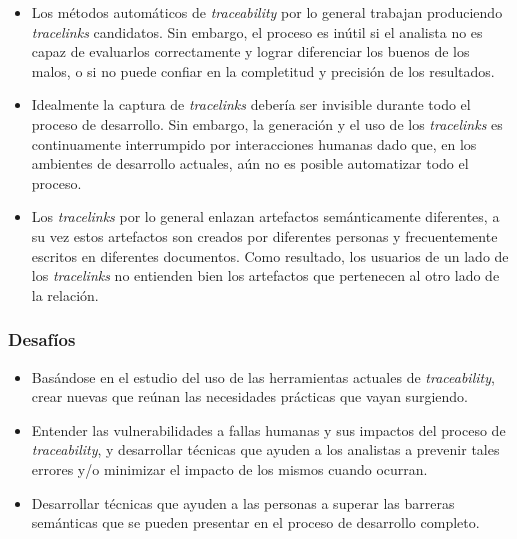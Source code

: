 \documentclass[a4paper,12pt,oneside,spanish]{book}
\begin{document}
\begin{itemize}[label={$\times$}]

\item Los métodos automáticos de \textit{traceability} por lo general trabajan produciendo \textit{tracelinks} candidatos. Sin embargo, el proceso es inútil si el analista no es capaz de evaluarlos correctamente y lograr diferenciar los buenos de los malos, o si no puede confiar en la completitud y precisión de los resultados.

\item Idealmente la captura de \textit{tracelinks} debería ser invisible durante todo el proceso de desarrollo. Sin embargo, la generación y el uso de los \textit{tracelinks} es continuamente interrumpido por interacciones humanas dado que, en los ambientes de desarrollo actuales, aún no es posible automatizar todo el proceso.

\item Los \textit{tracelinks} por lo general enlazan artefactos semánticamente diferentes, a su vez estos artefactos son creados por diferentes personas y frecuentemente escritos en diferentes documentos. Como resultado, los usuarios de un lado de los \textit{tracelinks} no entienden bien los artefactos que pertenecen al otro lado de la relación.

\end{itemize}

\subsubsection{Desafíos}

\begin{itemize}[label={\checkmark}]

\item Basándose en el estudio del uso de las herramientas actuales de \textit{traceability}, crear nuevas que reúnan las necesidades prácticas que vayan surgiendo.

\item Entender las vulnerabilidades a fallas humanas y sus impactos del proceso de \textit{traceability}, y desarrollar técnicas que ayuden a los analistas a prevenir tales errores y/o minimizar el impacto de los mismos cuando ocurran.

\item Desarrollar técnicas que ayuden a las personas a superar las barreras semánticas que se pueden presentar en el proceso de desarrollo completo.

\end{itemize}
\end{document}
